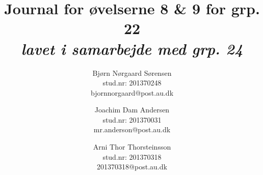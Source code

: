 

	\chead{\myTitle}	\rhead{\today}
\lfoot{}		\cfoot{}			\rfoot{\thepage}
\renewcommand{\headrulewidth}{1pt}
\renewcommand{\footrulewidth}{0pt}

\newcommand{\myTitle}{\textbf{Journal for øvelserne 8 \& 9 for grp. 22}}
\newcommand{\mySubTitle}{\textit{lavet i samarbejde med grp. 24}}
\title{\myTitle \\ \mySubTitle}
\author{
	Bjørn Nørgaard Sørensen\\
	stud.nr: 201370248\\
	bjornnorgaard@post.au.dk
	\and
	Joachim Dam Andersen\\
	stud.nr: 201370031\\
	mr.anderson@post.au.dk
	\and
	Arni Thor Thorsteinsson\\
	stud.nr: 201370318\\
	201370318@post.au.dk
}


	\maketitle
	\newpage
	
	
	\newpage
	
	\newpage
	

